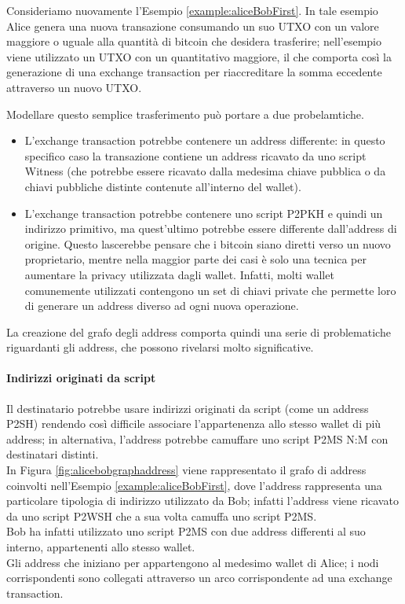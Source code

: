 \begin{example}
Consideriamo nuovamente l’Esempio \ref{example:aliceBobFirst}. In tale esempio  Alice genera una nuova transazione consumando un suo UTXO con un valore maggiore o uguale alla quantità  di bitcoin che desidera trasferire; nell'esempio viene utilizzato un UTXO con un quantitativo maggiore, il che comporta così la generazione di una exchange transaction per riaccreditare la somma eccedente attraverso un nuovo UTXO.

Modellare questo semplice trasferimento può portare a due probelamtiche.

\begin{itemize}
  \item L’exchange transaction potrebbe contenere un address differente: in questo specifico caso la transazione contiene un address ricavato da uno script Witness (che potrebbe essere ricavato dalla medesima chiave pubblica o da chiavi pubbliche distinte contenute all’interno del wallet).

  \item L'exchange transaction potrebbe contenere uno script P2PKH e quindi un indirizzo primitivo, ma quest’ultimo potrebbe essere differente dall’address di origine. Questo lascerebbe pensare che i bitcoin  siano diretti verso un nuovo proprietario, mentre nella maggior parte dei casi è solo una tecnica per aumentare la privacy utilizzata dagli wallet.
Infatti, molti  wallet comunemente utilizzati contengono un set di chiavi private che permette loro di generare un address diverso ad ogni nuova operazione.
\end{itemize}

\end{example}

La creazione del grafo degli address comporta quindi una serie di problematiche riguardanti gli address, che possono rivelarsi molto significative.

\paragraph*{Indirizzi originati da script}  Il destinatario potrebbe usare indirizzi originati da script (come un address P2SH) rendendo così difficile associare l’appartenenza allo stesso wallet di più address; in alternativa,  l’address potrebbe camuffare uno script P2MS N:M con destinatari distinti. \\
  In Figura \ref{fig:alicebobgraphaddress} viene rappresentato il grafo di address coinvolti nell’Esempio \ref{example:aliceBobFirst}, dove l’address  rappresenta una particolare tipologia di indirizzo utilizzato da Bob; infatti l’address viene ricavato da uno script P2WSH che a sua volta camuffa uno script P2MS. \\
  Bob ha infatti utilizzato uno script P2MS con due address differenti al suo interno, appartenenti allo stesso wallet. \\
  Gli address che iniziano per  appartengono al medesimo wallet di Alice; i nodi corrispondenti sono collegati attraverso un arco corrispondente ad una exchange transaction.

